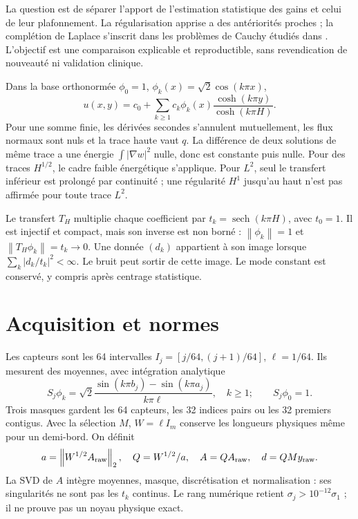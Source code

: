 \documentclass[11pt,a4paper]{article}
\newcommand{\norm}[1]{\left\lVert#1\right\rVert}
\newcommand{\sech}{\operatorname{sech}}
\begin{document}
La question est de séparer l'apport de l'estimation statistique des gains et celui de leur plafonnement. La régularisation apprise a des antériorités proches \cite{R01,R02}; la complétion de Laplace s'inscrit dans les problèmes de Cauchy étudiés dans \cite{C2}. L'objectif est une comparaison explicable et reproductible, sans revendication de nouveauté ni validation clinique.

Dans la base orthonormée $\phi_0=1$, $\phi_k(x)=\sqrt2\cos(k\pi x)$,
\begin{equation}
u(x,y)=c_0+\sum_{k\ge1}c_k\phi_k(x)\frac{\cosh(k\pi y)}{\cosh(k\pi H)}.
\end{equation}
Pour une somme finie, les dérivées secondes s'annulent mutuellement, les flux normaux sont nuls et la trace haute vaut $q$. La différence de deux solutions de même trace a une énergie $\int|\nabla w|^2$ nulle, donc est constante puis nulle. Pour des traces $H^{1/2}$, le cadre faible énergétique s'applique. Pour $L^2$, seul le transfert inférieur est prolongé par continuité ; une régularité $H^1$ jusqu'au haut n'est pas affirmée pour toute trace $L^2$.

Le transfert $T_H$ multiplie chaque coefficient par $t_k=\sech(k\pi H)$, avec $t_0=1$. Il est injectif et compact, mais son inverse est non borné : $\norm{\phi_k}=1$ et $\norm{T_H\phi_k}=t_k\to0$. Une donnée $(d_k)$ appartient à son image lorsque $\sum_k|d_k/t_k|^2<\infty$. Le bruit peut sortir de cette image. Le mode constant est conservé, y compris après centrage statistique.

\section{Acquisition et normes}
Les capteurs sont les 64 intervalles $I_j=[j/64,(j+1)/64]$, $\ell=1/64$. Ils mesurent des moyennes, avec intégration analytique
\begin{equation}
S_j\phi_k=\sqrt2\frac{\sin(k\pi b_j)-\sin(k\pi a_j)}{k\pi\ell},\quad k\ge1;\qquad S_j\phi_0=1.
\end{equation}
Trois masques gardent les 64 capteurs, les 32 indices pairs ou les 32 premiers contigus. Avec la sélection $M$, $W=\ell I_m$ conserve les longueurs physiques même pour un demi-bord. On définit
\[
a=\norm{W^{1/2}A_{\rm raw}}_2,\quad Q=W^{1/2}/a,\quad A=QA_{\rm raw},\quad d=QM y_{\rm raw}.
\]
La SVD de $A$ intègre moyennes, masque, discrétisation et normalisation : ses singularités ne sont pas les $t_k$ continus. Le rang numérique retient $\sigma_j>10^{-12}\sigma_1$ ; il ne prouve pas un noyau physique exact.
\end{document}
